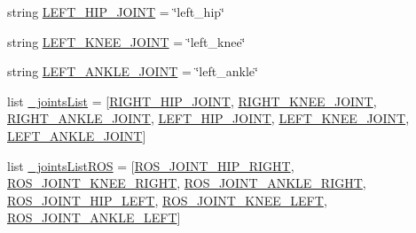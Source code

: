 \begin{DoxyCompactItemize}
\item 
string \mbox{\hyperlink{namespacepedal__simulation_a5ff646330c3b18de13c02db035719f48}{L\+E\+F\+T\+\_\+\+H\+I\+P\+\_\+\+J\+O\+I\+NT}} = \char`\"{}left\+\_\+hip\char`\"{}
\item 
string \mbox{\hyperlink{namespacepedal__simulation_a2e12c9299a343186db2633fc43b777c8}{L\+E\+F\+T\+\_\+\+K\+N\+E\+E\+\_\+\+J\+O\+I\+NT}} = \char`\"{}left\+\_\+knee\char`\"{}
\item 
string \mbox{\hyperlink{namespacepedal__simulation_ab65f757e695ae70c2659ce5fe3eeef5d}{L\+E\+F\+T\+\_\+\+A\+N\+K\+L\+E\+\_\+\+J\+O\+I\+NT}} = \char`\"{}left\+\_\+ankle\char`\"{}
\item 
list \mbox{\hyperlink{namespacepedal__simulation_a90eaa4eedceada2483c18daf6837b72c}{\+\_\+joints\+List}} = \mbox{[}\mbox{\hyperlink{namespacepedal__simulation_a90d2f00ff0e334bc02f23bcd4b540d8c}{R\+I\+G\+H\+T\+\_\+\+H\+I\+P\+\_\+\+J\+O\+I\+NT}}, \mbox{\hyperlink{namespacepedal__simulation_a28d4609f3a19f8e565ae3548ef73f990}{R\+I\+G\+H\+T\+\_\+\+K\+N\+E\+E\+\_\+\+J\+O\+I\+NT}}, \mbox{\hyperlink{namespacepedal__simulation_a277daee547841cc41def2598a8beb6f1}{R\+I\+G\+H\+T\+\_\+\+A\+N\+K\+L\+E\+\_\+\+J\+O\+I\+NT}}, \mbox{\hyperlink{namespacepedal__simulation_a5ff646330c3b18de13c02db035719f48}{L\+E\+F\+T\+\_\+\+H\+I\+P\+\_\+\+J\+O\+I\+NT}}, \mbox{\hyperlink{namespacepedal__simulation_a2e12c9299a343186db2633fc43b777c8}{L\+E\+F\+T\+\_\+\+K\+N\+E\+E\+\_\+\+J\+O\+I\+NT}}, \mbox{\hyperlink{namespacepedal__simulation_ab65f757e695ae70c2659ce5fe3eeef5d}{L\+E\+F\+T\+\_\+\+A\+N\+K\+L\+E\+\_\+\+J\+O\+I\+NT}}\mbox{]}
\item 
list \mbox{\hyperlink{namespacepedal__simulation_ae58c6872ed54574661bf60918ac4107e}{\+\_\+joints\+List\+R\+OS}} = \mbox{[}\mbox{\hyperlink{namespacepedal__simulation_aa2d21a54aac1c1e059d8a17050ddfed4}{R\+O\+S\+\_\+\+J\+O\+I\+N\+T\+\_\+\+H\+I\+P\+\_\+\+R\+I\+G\+HT}}, \mbox{\hyperlink{namespacepedal__simulation_ad8c24ef49f1c476e1ad8be5bc4d1c710}{R\+O\+S\+\_\+\+J\+O\+I\+N\+T\+\_\+\+K\+N\+E\+E\+\_\+\+R\+I\+G\+HT}}, \mbox{\hyperlink{namespacepedal__simulation_a091f63fe58d9a41b150f5029e548f08f}{R\+O\+S\+\_\+\+J\+O\+I\+N\+T\+\_\+\+A\+N\+K\+L\+E\+\_\+\+R\+I\+G\+HT}}, \mbox{\hyperlink{namespacepedal__simulation_a6caf046a25da8884a3feed405121b7db}{R\+O\+S\+\_\+\+J\+O\+I\+N\+T\+\_\+\+H\+I\+P\+\_\+\+L\+E\+FT}}, \mbox{\hyperlink{namespacepedal__simulation_ada493a22ef9aa6120fb10a58db55e10d}{R\+O\+S\+\_\+\+J\+O\+I\+N\+T\+\_\+\+K\+N\+E\+E\+\_\+\+L\+E\+FT}}, \mbox{\hyperlink{namespacepedal__simulation_a402a36b90d4ebf203bc19976ec7d52c6}{R\+O\+S\+\_\+\+J\+O\+I\+N\+T\+\_\+\+A\+N\+K\+L\+E\+\_\+\+L\+E\+FT}}\mbox{]}

\end{DoxyCompactItemize}
